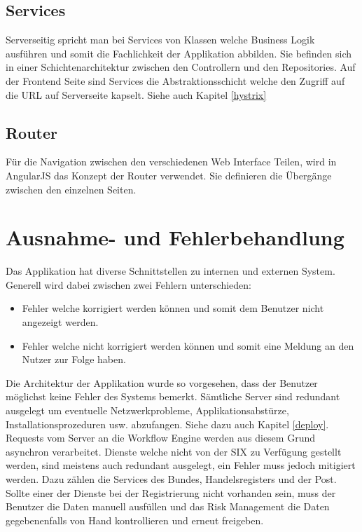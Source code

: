 \subsection{Services}

Serverseitig spricht man bei Services von Klassen welche Business Logik ausführen und somit die Fachlichkeit der Applikation abbilden. Sie befinden sich in einer Schichtenarchitektur zwischen den Controllern und den Repositories. Auf der Frontend Seite sind Services die Abstraktionsschicht welche den Zugriff auf die URL auf Serverseite kapselt. Siehe auch Kapitel \ref{hystrix}

\subsection{Router}

Für die Navigation zwischen den verschiedenen Web Interface Teilen, wird in AngularJS das Konzept der Router verwendet. Sie definieren die Übergänge zwischen den einzelnen Seiten.

\section{Ausnahme- und Fehlerbehandlung}

Das Applikation hat diverse Schnittstellen zu internen und externen System. Generell wird dabei zwischen zwei Fehlern unterschieden:
\begin{itemize}
	\item Fehler welche korrigiert werden können und somit dem Benutzer nicht angezeigt werden.
	\item Fehler welche nicht korrigiert werden können und somit eine Meldung an den Nutzer zur Folge haben.
\end{itemize}
Die Architektur der Applikation wurde so vorgesehen, dass der Benutzer möglichst keine Fehler des Systems bemerkt. Sämtliche Server sind redundant ausgelegt um eventuelle Netzwerkprobleme, Applikationsabstürze, Installationsprozeduren usw. abzufangen. Siehe dazu auch Kapitel \ref{deploy}. Requests vom Server an die Workflow Engine werden aus diesem Grund asynchron verarbeitet.\newline
Dienste welche nicht von der SIX zu Verfügung gestellt werden, sind meistens auch redundant ausgelegt, ein Fehler muss jedoch mitigiert werden. Dazu zählen die Services des Bundes, Handelsregisters und der Post. Sollte einer der Dienste bei der Registrierung nicht vorhanden sein, muss der Benutzer die Daten manuell ausfüllen und das Risk Management die Daten gegebenenfalls von Hand kontrollieren und erneut freigeben.

